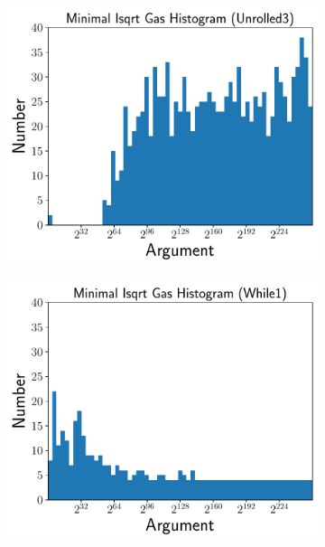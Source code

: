 \begin{figure}[p]
\centering
    \begin{subfigure}[t]{0.45\textwidth}
    \includegraphics[width=\textwidth]{plots/minimal_hist_Unrolled3.pdf}
    \end{subfigure}
    \begin{subfigure}[t]{0.45\textwidth}
    \includegraphics[width=\textwidth]{plots/minimal_hist_While1.pdf}
    \end{subfigure}


\end{figure}
